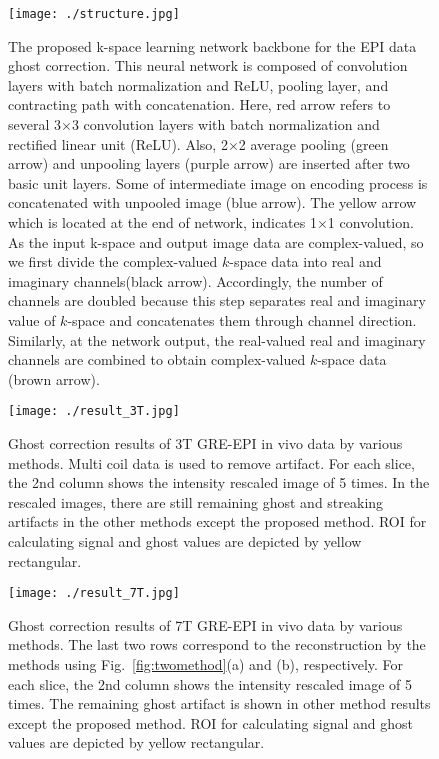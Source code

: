\documentclass[num-refs]{wiley-article}
\newcommand{\0}{{\boldsymbol{0}}}
\newcommand{\1}{\blmath{1}}
\begin{document}
	\begin{figure}[h]
		\centering
		\texttt{[image: ./structure.jpg]}
		\caption{
			The proposed k-space learning network backbone for the EPI data ghost correction. This neural network is composed of convolution layers with batch normalization and ReLU, pooling layer, and contracting path with concatenation. Here, red arrow refers to several 3$\times$3 convolution layers with batch normalization and rectified linear unit (ReLU). Also, 2$\times$2 average pooling (green arrow) and unpooling layers (purple arrow) are inserted after two basic unit layers. Some of intermediate image on encoding process is concatenated with unpooled image (blue arrow). The yellow arrow which is located at the end of network, indicates 1$\times$1 convolution. As the input k-space and output image data are complex-valued, so we first divide the complex-valued $k$-space data into real and imaginary channels(black arrow). Accordingly, the number of channels are doubled because this step separates real and imaginary value of $k$-space and concatenates them through channel direction. Similarly, at the network output, the real-valued real and imaginary channels are combined to obtain complex-valued $k$-space data (brown arrow).}
		\label{fig:structure}
	\end{figure}
	
	\begin{figure}[h]
		\centering
		\texttt{[image: ./result\_3T.jpg]}
		\caption{
			Ghost correction results of 3T GRE-EPI in vivo data by various methods. Multi coil data is used to remove artifact. For each slice, the 2nd column shows the intensity rescaled image of 5 times. In the rescaled images, there are still remaining ghost and streaking artifacts in the other methods except the proposed method. ROI for calculating signal and ghost values are depicted by yellow rectangular.}
		\label{fig:result_3T}
	\end{figure}
	
	\begin{figure}[h]
		\centering
		\texttt{[image: ./result\_7T.jpg]}
		\caption{Ghost correction results of 7T GRE-EPI in vivo data by various methods. The last two rows correspond to the reconstruction by the methods  using Fig.~\ref{fig:twomethod}(a) and (b), respectively.
			For each slice, the 2nd column shows the intensity rescaled image of 5 times. The remaining ghost artifact is shown in other method results except the proposed method. ROI for calculating signal and ghost values are depicted by yellow rectangular.}
		\label{fig:result_7T}
	\end{figure}
	
\end{document}
